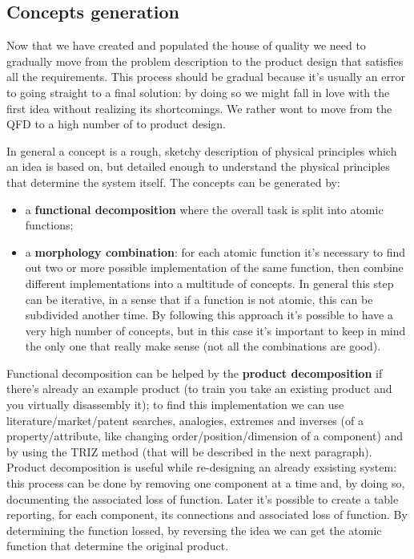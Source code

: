 	\subsection{Concepts generation}
		Now that we have created and populated the house of quality we need to gradually move from the problem description to the product design that satisfies all the requirements. This process should be gradual because it's usually an error to going straight to a final solution: by doing so we might fall in love with the first idea without realizing its shortcomings. We rather wont to move from the QFD to a high number of  to product design.
		
		In general a concept is a rough, sketchy description of physical principles which an idea is based on, but detailed enough to understand the physical principles that determine the system itself. The concepts can be generated by:
		\begin{itemize}
			\item a \textbf{functional decomposition} where the overall task is split into atomic functions;
			\item a \textbf{morphology combination}: for each atomic function it's necessary to find out two or more possible implementation of the same function, then combine different implementations into a multitude of concepts. In general this step can be iterative, in a sense that if a function is not atomic, this can be subdivided another time. By following this approach it's possible to have a very high number of concepts, but in this case it's important to keep in mind the only one that really make sense (not all the combinations are good).
		\end{itemize}
		
		Functional decomposition can be helped by the \textbf{product decomposition} if there's already an example product (to train you take an existing product and you virtually disassembly it); to find this implementation we can use literature/market/patent searches, analogies, extremes and inverses (of a property/attribute, like changing order/position/dimension of a component) and by using the TRIZ method (that will be described in the next paragraph).\\
		Product decomposition is useful while re-designing an already exsisting system: this process can be done by removing one component at a time and, by doing so, documenting the associated loss of function. Later it's possible to create a table reporting, for each component, its connections and associated loss of function. By determining the function lossed, by reversing the idea we can get the atomic function that determine the original product.
		
